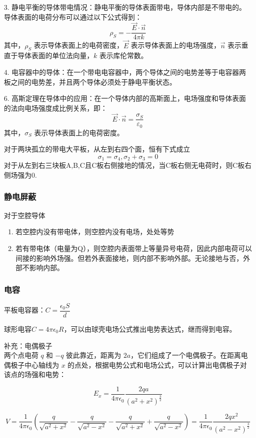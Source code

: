 3. 静电平衡的导体带电情况：静电平衡的导体表面带电，导体内部是不带电的。导体表面的电荷分布可以通过以下公式得到：$$ \rho_S = -\frac{\vec{E}\cdot\vec{n}}{4\pi k} $$ 其中，$\rho_S$ 表示导体表面上的电荷密度，$\vec{E}$ 表示导体表面上的电场强度，$\vec{n}$ 表示垂直于导体表面的单位法向量，$k$ 表示库伦常数。

4. 电容器中的导体：在一个带电电容器中，两个导体之间的电势差等于电容器两板之间的电势差，并且两个导体必须处于静电平衡状态。

6. 高斯定理在导体中的应用：在一个导体内部的高斯面上，电场强度和导体表面的法向电场强度成比例关系，即：$$ \vec{E}\cdot\vec{n} = \frac{\sigma_S}{\varepsilon_0} $$ 其中，$\sigma_S$ 表示导体表面上的电荷密度。

对于两块孤立的带电大平板，从左到右四个面，恒有下式成立
\begin{equation}\label{key}
	\sigma_1=\sigma_4,\sigma_2+\sigma_3=0
\end{equation}
对于从左到右三块板A,B,C且C板右侧接地的情况，当C板右侧无电荷时，则C板右侧场强为0.


\subsubsection{静电屏蔽}
对于空腔导体
\begin{enumerate}
	\item 若空腔内没有带电体，则空腔内没有电场，处处等势
	\item 若有带电体（电量为Q），则空腔内表面带上等量异号电荷，因此内部电荷可以间接的影响外场强。但若外表面接地，则内部不影响外部。无论接地与否，外部不影响内部。
\end{enumerate}

\subsubsection{电容}
平板电容器：$ C=\dfrac{\epsilon_0S}{d} $

球形电容$ C=4\pi \epsilon_0 R $，可以由球壳电场公式推出电势表达式，继而得到电容。

补充：电偶极子\\
两个点电荷 $q$ 和 $-q$ 彼此靠近，距离为 $2a$，它们组成了一个电偶极子。在距离电偶极子中心轴线为 $x$ 的点处，根据电势公式和电场公式，可以计算出电偶极子对该点的场强和电势：

$$ E_x = \frac{1}{4\pi\epsilon_0}\frac{2qa}{(a^2 + x^2)^{\frac{3}{2}}} $$

$$ V = \frac{1}{4\pi\epsilon_0} \left( \frac{q}{\sqrt{a^2+x^2}} - \frac{q}{\sqrt{a^2-x^2}} - \frac{q}{\sqrt{a^2+x^2}} + \frac{q}{\sqrt{a^2-x^2}} \right) = \frac{1}{4\pi\epsilon_0} \frac{2qx^2}{(a^2 - x^2)^{\frac{3}{2}}} $$

